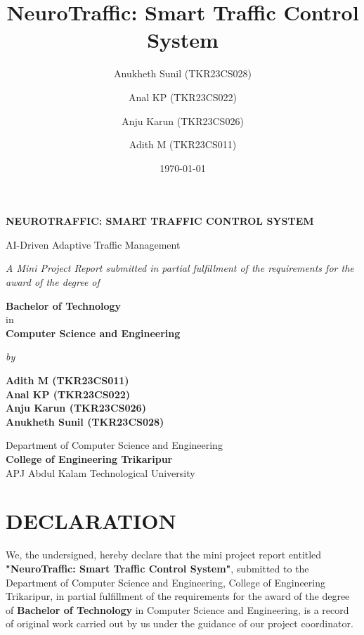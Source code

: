 \documentclass[12pt,a4paper]{report}
\title{NeuroTraffic: Smart Traffic Control System}
\author{Anukheth Sunil (TKR23CS028) \and Anal KP (TKR23CS022) \and Anju Karun (TKR23CS026) \and Adith M (TKR23CS011)}
\date{\today}
\begin{document}
\begin{titlepage}
    \begin{center}
        \vspace*{1cm}
        
        \Huge
        \textbf{NEUROTRAFFIC: SMART TRAFFIC CONTROL SYSTEM}
        
        \vspace{0.5cm}
        \LARGE
        AI-Driven Adaptive Traffic Management
        
        \vspace{1.5cm}
        
        \normalsize
        \textit{A Mini Project Report submitted in partial fulfillment of the requirements for the award of the degree of}
        
        \vspace{0.5cm}
        \large
        \textbf{Bachelor of Technology} \\
        in \\
        \textbf{Computer Science and Engineering}
        
        \vspace{1cm}
        
        \normalsize
        \textit{by}
        
        \vspace{0.5cm}
        \large
        \textbf{Adith M (TKR23CS011)} \\
        \textbf{Anal KP (TKR23CS022)} \\
        \textbf{Anju Karun (TKR23CS026)} \\
        \textbf{Anukheth Sunil (TKR23CS028)}
        
        \vfill %
        
        \vspace{1cm}
        
        \Large
        Department of Computer Science and Engineering \\
        \textbf{College of Engineering Trikaripur} \\
        \large
        APJ Abdul Kalam Technological University
        
    \end{center}
\end{titlepage}

\pagestyle{plain}

\chapter*{DECLARATION}
We, the undersigned, hereby declare that the mini project report entitled \textbf{"NeuroTraffic: Smart Traffic Control System"}, submitted to the Department of Computer Science and Engineering, College of Engineering Trikaripur, in partial fulfillment of the requirements for the award of the degree of \textbf{Bachelor of Technology} in Computer Science and Engineering, is a record of original work carried out by us under the guidance of our project coordinator.
\end{document}

